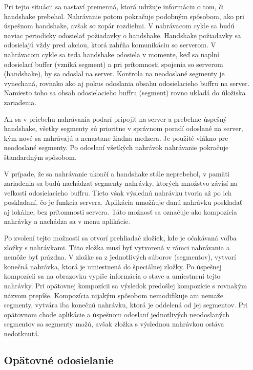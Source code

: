 Pri tejto situácii sa nastaví premenná, ktorá udržuje informáciu o tom, či handshake prebehol. Nahrávanie potom pokračuje podobným spôsobom, ako pri úspešnom handshake, avšak so zopár rozdielmi. V nahrávacom cykle sa budú naviac periodicky odosielať požiadavky o handshake. Handshake požiadavky sa odosielajú vždy pred akciou, ktorá zahŕňa komunikáciu so serverom. V nahrávacom cykle sa teda handshake odosiela v momente, keď sa naplní odosielací buffer (vzniká segment) a pri prítomnosti spojenia so serverom (handshake), by sa odoslal na server. Kontrola na neodoslané segmenty je vynechaná, rovnako ako aj pokus odoslania obsahu odosielacieho buffru na server. Namiesto toho sa obsah odosielacieho buffru (segment) rovno ukladá do úložiska zariadenia.

Ak sa v priebehu nahrávania podarí pripojiť na server a prebehne úspešný handshake, všetky segmenty sú prioritne v správnom poradí odoslané na server, kým nové sa nahrávajú a nenastane žiadna medzera. Je použité vlákno pre neodoslané segmenty. Po odoslaní všetkých nahrávok nahrávanie pokračuje štandardným spôsobom.

V prípade, že sa nahrávanie ukončí a handshake stále neprebehol, v pamäti zariadenia sa budú nachádzať segmenty nahrávky, ktorých množstvo závisí na veľkosti odosielacieho buffru. Tieto však výslednú nahrávku tvoria až po ich poskladaní, čo je funkcia servera. Aplikácia umožňuje danú nahrávku poskladať aj lokálne, bez prítomnosti servera. Táto možnosť sa označuje ako kompozícia nahrávky a nachádza sa v menu aplikácie.

Po zvolení tejto možnosti sa otvorí prehliadač zložiek, kde je očakávaná voľba zložky s nahrávkami. Táto zložka musí byť vytvorená v rámci nahrávania a nemôže byť prázdna. V zložke sa z jednotlivých súborov (segmentov), vytvorí konečná nahrávka, ktorá je umiestnená do špeciálnej zložky. Po úspešnej kompozícii sa na obrazovku vypíše informácia o stave a umiestnení tejto nahrávky. Pri opätovnej kompozícii sa výsledok predošlej kompozície s rovnakým názvom prepíše. Kompozícia nijakým spôsobom nemodifikuje ani nemaže segmenty, vytvára iba konečnú nahrávku, ktorá je oddelená od jej segmentov. Pri opätovnom chode aplikácie a úspešnom odoslaní jednotlivých neodoslaných segmentov sa segmenty mažú, avšak zložka s výslednou nahrávkou ostáva nedotknutá.


\subsection{Opätovné odosielanie}
\label{sending-unsent}

